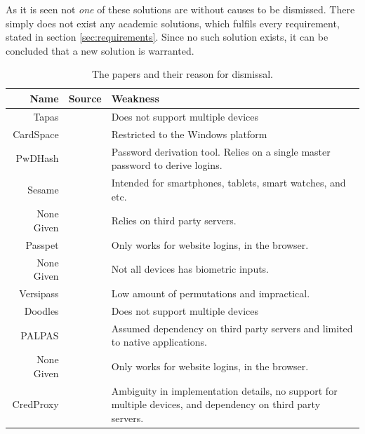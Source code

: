 			As it is seen not \emph{one} of these solutions are without causes to be dismissed. There simply does not exist any academic solutions, which fulfils every requirement, stated in section \ref{sec:requirements}. Since no such solution exists, it can be concluded that a new solution is warranted.

			\begin{table}
				\begin{tabular}{r | c |  p{6cm}}
					Name 					& Source 										& Weakness \\
					\hline
					Tapas 					& \cite{tapas} 									& Does not support multiple devices \\
					\hline
					CardSpace 				& \cite{cardspace, cardspace_impl} 				& Restricted to the Windows platform \\
					\hline
					PwDHash 				& \cite{pwdhash} 								& Password derivation tool. Relies on a single master password to derive logins. \\
					\hline
 					Sesame 					& \cite{sesame} 								& Intended for smartphones, tablets, smart watches, and etc. \\
					\hline
					None Given 				& \cite{browser_saved} 							& Relies on third party servers. \\
					\hline
					Passpet 				& \cite{passpet} 								& Only works for website logins, in the browser. \\
					\hline
					None Given 				& \cite{busch2014} 								& Not all devices has biometric inputs. \\
					\hline
					Versipass 				& \cite{stobert2014}  							& Low amount of permutations and impractical. \\
					\hline
					Doodles 				& \cite{doodles} 								& Does not support multiple devices \\
					\hline
					PALPAS 					& \cite{palpas} 								& Assumed dependency on third party servers and limited to native applications. \\
					\hline
					None Given 				& \cite{zhao2014} 								& Only works for website logins, in the browser. \\
					\hline
					CredProxy 				& \cite{golrang2012} 							& Ambiguity in implementation details, no support for multiple devices, and dependency on third party servers.\\
				\end{tabular}
				\caption{The papers and their reason for dismissal.}
				\label{tab:paper_dismiss}
			\end{table}

